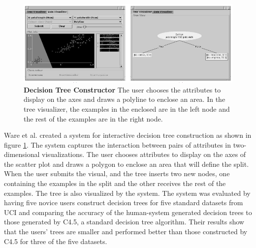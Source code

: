 \begin{figure}[h]
\centering
\includegraphics[width=1\textwidth]{dtreeconstructor}
\caption{\textbf{Decision Tree Constructor} The user chooses the attributes to display on the axes and draws a polyline to enclose an area. In the tree visualizer, the examples in the enclosed are in the left node and the rest of the examples are in the right node. }\label{fig:dtreeconstructor}
\end{figure}

Ware et al. \cite{InteractiveML} created a system for interactive decision tree construction as shown in figure \ref{fig:dtreeconstructor}. The system captures the interaction between pairs of attributes in two-dimensional visualizations. The user chooses attributes to display on the axes of the scatter plot and draws a polygon to enclose an area that will define the split. When the user submits the visual, and the tree inserts two new nodes, one containing the examples in the split and the other receives the rest of the examples. The tree is also visualized by the system. The system was evaluated by having five novice users construct decision trees for five standard datasets from UCI and comparing the accuracy of the human-system generated decision trees to those generated by C4.5, a standard decision tree algorithm. Their results show that the users' trees are smaller and performed better than those constructed by C4.5 for three of the five datasets. 

